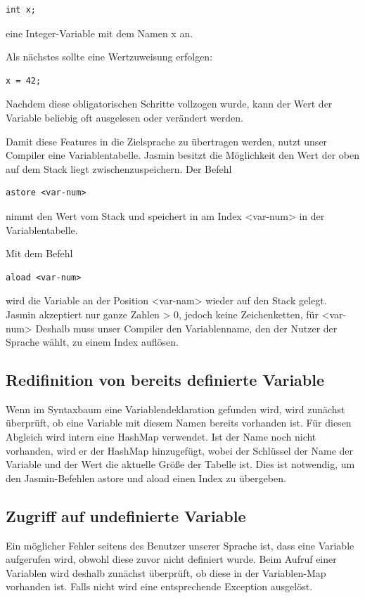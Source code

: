 \documentclass[12pt, a4paper, oneside, ngerman]{article}
\begin{document}
\begin{lstlisting}[frame=single]
int x;
\end{lstlisting}

eine Integer-Variable mit dem Namen x an.

Als nächstes sollte eine Wertzuweisung erfolgen:
\begin{lstlisting}[frame=single]
x = 42;
\end{lstlisting}

Nachdem diese obligatorischen Schritte vollzogen wurde, kann der Wert der Variable beliebig oft ausgelesen oder verändert werden.

Damit diese Features in die Zielsprache zu übertragen werden, nutzt unser Compiler eine Variablentabelle. Jasmin besitzt die Möglichkeit den Wert der oben auf dem Stack liegt zwischenzuspeichern. Der Befehl
\begin{lstlisting}[frame=single]
astore <var-num>
\end{lstlisting}
nimmt den Wert vom Stack und speichert in am Index <var-num> in der Variablentabelle.

Mit dem Befehl
\begin{lstlisting}[frame=single]
aload <var-num>
\end{lstlisting}
wird die Variable an der Position <var-nam> wieder auf den Stack gelegt. 
Jasmin akzeptiert nur ganze Zahlen > 0, jedoch keine Zeichenketten, für <var-num>
Deshalb muss unser Compiler den Variablenname, den der Nutzer der Sprache wählt, zu einem Index auflösen.

\subsection*{Redifinition von bereits definierte Variable}
Wenn im Syntaxbaum eine Variablendeklaration gefunden wird, wird zunächst überprüft, ob eine Variable mit diesem Namen bereits vorhanden ist. Für diesen Abgleich wird intern eine HashMap verwendet. Ist der Name noch nicht vorhanden, wird er der HashMap hinzugefügt, wobei der Schlüssel der Name der Variable und der Wert die aktuelle Größe der Tabelle ist. Dies ist notwendig, um den Jasmin-Befehlen astore und aload einen Index  zu übergeben.

\subsection*{Zugriff auf undefinierte Variable}
Ein möglicher Fehler seitens des Benutzer unserer Sprache ist, dass eine Variable aufgerufen wird, obwohl diese zuvor nicht definiert wurde. Beim Aufruf einer Variablen wird deshalb zunächst überprüft, ob diese in der Variablen-Map vorhanden ist. Falls nicht wird eine entsprechende Exception ausgelöst.
\end{document}
